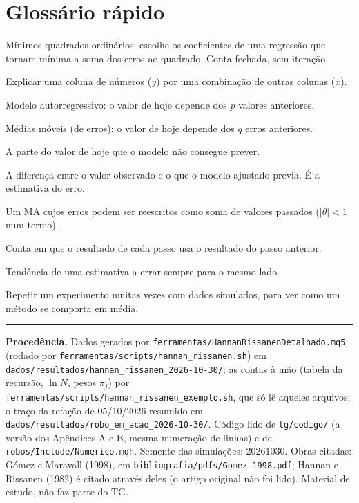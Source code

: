 \documentclass[11pt,a4paper]{article}
\begin{document}
\section*{Glossário rápido}
\begin{description}[leftmargin=2.6cm, style=nextline, itemsep=1pt, font=\normalfont\bfseries]
\item[MQO] Mínimos quadrados ordinários: escolhe os coeficientes de uma regressão que tornam mínima a soma dos erros
  ao quadrado. Conta fechada, sem iteração.
\item[Regressão] Explicar uma coluna de números ($y$) por uma combinação de outras colunas ($x$).
\item[AR($p$)] Modelo autorregressivo: o valor de hoje depende dos $p$ valores anteriores.
\item[MA($q$)] Médias móveis (de erros): o valor de hoje depende dos $q$ erros anteriores.
\item[Erro, surpresa] A parte do valor de hoje que o modelo não consegue prever.
\item[Resíduo] A diferença entre o valor observado e o que o modelo ajustado previa. É a estimativa do erro.
\item[Invertível] Um MA cujos erros podem ser reescritos como soma de valores passados ($|\theta| < 1$ num termo).
\item[Recursão] Conta em que o resultado de cada passo usa o resultado do passo anterior.
\item[Viés] Tendência de uma estimativa a errar sempre para o mesmo lado.
\item[Monte Carlo] Repetir um experimento muitas vezes com dados simulados, para ver como um método se comporta em
  média.
\end{description}

\vfill
\noindent\rule{\linewidth}{0.4pt}
{\footnotesize\sloppy\textbf{Procedência.} Dados gerados por \nolinkurl{ferramentas/HannanRissanenDetalhado.mq5} (rodado por
\nolinkurl{ferramentas/scripts/hannan_rissanen.sh}) em \nolinkurl{dados/resultados/hannan_rissanen_2026-10-30/}; as contas à
mão (tabela da recursão, $\ln N$, pesos $\pi_j$) por \nolinkurl{ferramentas/scripts/hannan_rissanen_exemplo.sh}, que só lê
aqueles arquivos; o traço da refação de 05/10/2026 resumido em \nolinkurl{dados/resultados/robo_em_acao_2026-10-30/}.
Código lido de \nolinkurl{tg/codigo/} (a versão dos Apêndices A e B, mesma numeração de linhas) e de
\nolinkurl{robos/Include/Numerico.mqh}. Semente das simulações: 20261030. Obras citadas: Gómez e Maravall (1998), em
\nolinkurl{bibliografia/pdfs/Gomez-1998.pdf}; Hannan e Rissanen (1982) é citado através deles (o artigo original não foi
lido). Material de estudo, não faz parte do TG.\par}
\end{document}
